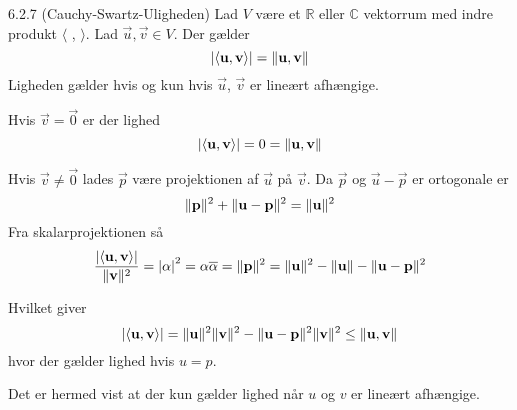 %
%

\begin{saetning}{6.2.7 (Cauchy-Swartz-Uligheden)}
	Lad $V$ være et $\mathbb{R}$ eller $\mathbb{C}$ vektorrum med indre produkt
	$\langle$ , $\rangle$. Lad $\vec{u}, \vec{v} \in V$. Der gælder
	\[
		\lvert \langle \mathbf{u}, \mathbf{v} \rangle \rvert = \lVert\mathbf{u},
		\mathbf{v}\rVert
	\]
	Ligheden gælder hvis og kun hvis $\vec{u}$, $\vec{v}$ er lineært afhængige.
\end{saetning}

\begin{bevis}
	Hvis $\vec{v}=\vec{0}$ er der lighed
	\[
		\lvert \langle \mathbf{u}, \mathbf{v} \rangle \rvert = 0 = \lVert\mathbf{u},
		\mathbf{v}\rVert
	\]
	
	\noindent Hvis $\vec{v} \not= \vec{0}$ lades $\vec{p}$ være projektionen af $\vec{u}$
	på $\vec{v}$. Da $\vec{p}$ og $\vec{u} - \vec{p}$ er ortogonale er
	\[
		\lVert\mathbf{p}\rVert^2 + \lVert\mathbf{u} - \mathbf{p}\rVert^2 = \lVert\mathbf{u}\rVert^2
	\]
	Fra skalarprojektionen så
	\[
		\frac{\lvert \langle \mathbf{u}, \mathbf{v} \rangle \rvert}{\lVert\mathbf{v}\rVert^2}
		= {\lvert \alpha \rvert}^2 = \alpha \overline\alpha = \lVert\mathbf{p}\rVert^2
		= \lVert\mathbf{u}\rVert^2 - \lVert\mathbf{u}\rVert - \lVert\mathbf{u} - \mathbf{p}\rVert^2
	\]
	\begin{center}
	\end{center}
	Hvilket giver
	\[
		\lvert \langle \mathbf{u}, \mathbf{v} \rangle \rvert = \lVert\mathbf{u}\rVert^2
		\lVert\mathbf{v}\rVert^2 - \lVert\mathbf{u} - \mathbf{p}\rVert^2\lVert\mathbf{v}\rVert^2 \leq
		\lVert\mathbf{u}, \mathbf{v}\rVert
	\]
	hvor der gælder lighed hvis $u=p$.

	Det er hermed vist at der kun gælder lighed når $u$ og $v$ er lineært
	afhængige.
\end{bevis}
